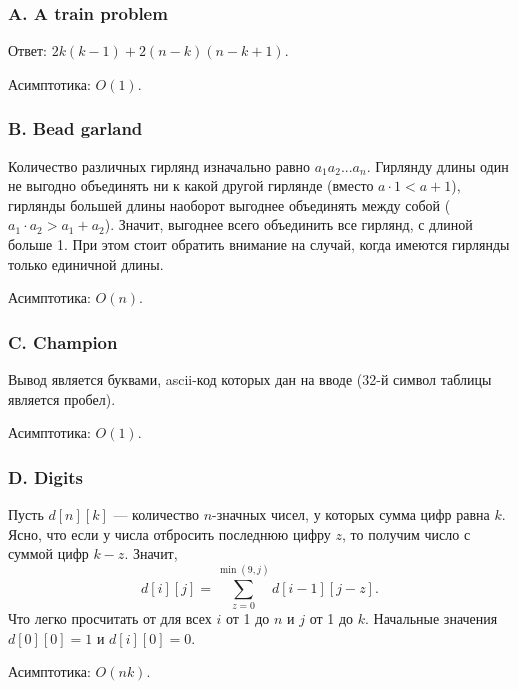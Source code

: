 \subsubsection*{A. A train problem}


Ответ: $2 k (k-1) + 2 (n-k) (n-k+1)$.

Асимптотика: $O(1)$.



\subsubsection*{B. Bead garland}


Количество различных гирлянд изначально равно $a_1 a_2 ... a_n$. Гирлянду длины один не выгодно объединять ни к какой другой гирлянде (вместо $a \cdot 1 < a + 1$), гирлянды большей длины наоборот выгоднее объединять между собой ($a_1 \cdot a_2 > a_1 + a_2$). Значит, выгоднее всего объединить все гирлянд, с длиной больше 1. При этом стоит обратить внимание на случай, когда имеются гирлянды только единичной длины.

Асимптотика: $O(n)$.



\subsubsection*{C. Champion}


Вывод является буквами, ascii-код которых дан на вводе (32-й символ таблицы является пробел).

Асимптотика: $O(1)$.



\subsubsection*{D. Digits}


Пусть $d[n][k]$ --- количество $n$-значных чисел, у которых сумма цифр равна $k$. Ясно, что если у числа отбросить последнюю цифру $z$, то получим число с суммой цифр $k - z$. Значит,
$$d[i][j] = \sum_{z=0}^{\min(9,j)} d[i-1][j-z].$$
Что легко просчитать от для всех $i$ от 1 до $n$ и $j$ от 1 до $k$. Начальные значения $d[0][0] = 1$ и $d[i][0] = 0$.

Асимптотика: $O(n k)$.



